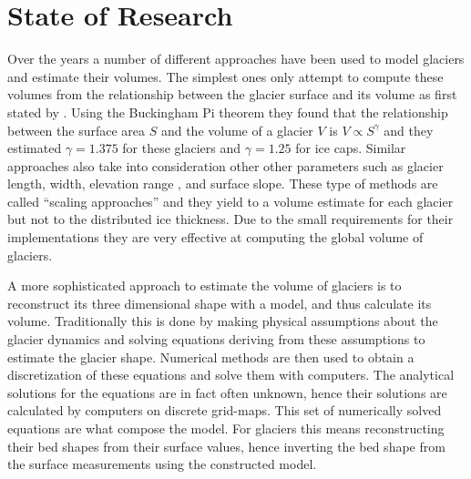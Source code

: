 \section{State of Research}\label{research}
Over the years a number of different approaches have been used to model glaciers and estimate their volumes.
The simplest ones only attempt to compute these volumes from the relationship between the glacier surface and its volume as first stated by \citet{bahr1997}. Using the Buckingham Pi
theorem they found that the relationship between the surface area $S$ and the volume of a glacier $V$ is $V \propto S^{\gamma}$ and they estimated $\gamma=1.375$ for these glaciers and $\gamma=1.25$ for ice caps. Similar approaches also take into consideration other other parameters such as glacier length, width, elevation range \citep{Grinsted2013}, and surface slope. These type of methods are called ``scaling approaches'' and they yield to a volume estimate for each glacier but not to the distributed ice thickness. Due to the small requirements for their implementations they are very effective at computing the global volume of glaciers.

A more sophisticated approach to estimate the volume of glaciers is to reconstruct its three dimensional shape with a model, and thus calculate its volume. Traditionally this is done by making physical assumptions about the glacier dynamics and solving equations deriving from these assumptions to estimate the glacier shape. Numerical methods are then used to obtain a discretization of these equations and solve them with computers. The analytical solutions for the equations are in fact often unknown, hence their solutions are calculated by computers on discrete grid-maps. This set of numerically solved equations are what compose the model. 
For glaciers this means reconstructing their bed shapes from their surface values, hence inverting the bed shape from the surface measurements using the constructed model.
 

